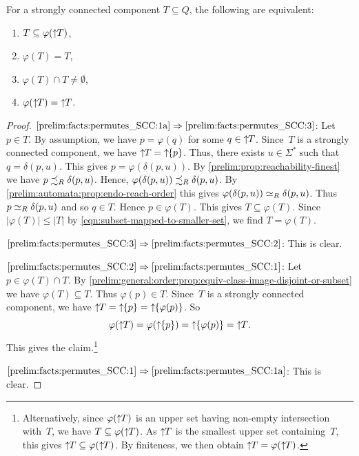 \begin{corollary} \label{prelim:automata:prop:endo:SCC}
	For a strongly connected component $T \subseteq Q$,
	the following are equivalent:
	\begin{enumerate}
		\item \label{prelim:facts:permutes_SCC:1a} $T \subseteq \varphi(\mbox{\ensuremath{\displaystyle \uparrow \!\!T}})$,
		
		\item \label{prelim:facts:permutes_SCC:3} $\varphi(T) = T$,

		\item \label{prelim:facts:permutes_SCC:2} $\varphi(T) \cap T \ne \emptyset$,
		
		\item \label{prelim:facts:permutes_SCC:1} $\varphi(\mbox{\ensuremath{\displaystyle \uparrow \!\!T}}) = \mbox{\ensuremath{\displaystyle \uparrow \!\!T}}$.
	\end{enumerate}	
\end{corollary}
\begin{proof}

$\ref{prelim:facts:permutes_SCC:1a} \Rightarrow \ref{prelim:facts:permutes_SCC:3}$:
Let $p \in T$. By assumption, we have $p = \varphi(q)$ for some $q \in \mbox{\ensuremath{\displaystyle \uparrow \!\!T}}$.
Since~$T$ is a strongly connected component,
we have $\mbox{\ensuremath{\displaystyle \uparrow \!\!T}} = \mbox{\ensuremath{\displaystyle \uparrow \!\!\{p\}}}$.
Thus, there exists $u \in \Sigma^*$ such that $q = \delta(p, u)$.
This gives $p = \varphi(\delta(p, u))$.
By \cref{prelim:prop:reachability-finest} we have 
$p \precsim_R \delta(p, u)$.
Hence, $\varphi(\delta(p, u)) \precsim_R \delta(p, u)$.
By \cref{prelim:automata:prop:endo-reach-order}
this gives $\varphi(\delta(p, u)) \simeq_R \delta(p, u)$.
Thus $p \simeq_R \delta(p, u)$
and so $q \in T$. Hence $p \in \varphi(T)$.
This gives $T \subseteq \varphi(T)$.
Since $|\varphi(T)| \le |T|$ by \cref{eqn:subset-mapped-to-smaller-set},
we find $T = \varphi(T)$.	

$\ref{prelim:facts:permutes_SCC:3} \Rightarrow \ref{prelim:facts:permutes_SCC:2}$: This is clear.

$\ref{prelim:facts:permutes_SCC:2} \Rightarrow \ref{prelim:facts:permutes_SCC:1}$: Let $p \in \varphi(T) \cap T$.
By \cref{prelim:general:order:prop:equiv-class-image-disjoint-or-subset} 
we have $\varphi(T) \subseteq T$.
Thus $\varphi(p) \in T$.
Since~$T$ is a strongly connected
component, we have $\mbox{\ensuremath{\displaystyle \uparrow \!\!T}} = \mbox{\ensuremath{\displaystyle \uparrow \!\!\{p\}}} = \mbox{\ensuremath{\displaystyle \uparrow \!\!\{\varphi(p)\}}}$. So
\[
\varphi(\upperset{T})
= \varphi(\upperset{\{p\}})
= \upperset{\{\varphi(p)\}}
= \upperset{T}.
\]
This gives the claim.\footnote{Alternatively,
	since $\varphi(\mbox{\ensuremath{\displaystyle \uparrow \!\!T}})$ is an upper set having non-empty intersection with~$T$,
	we have $T \subseteq \varphi(\mbox{\ensuremath{\displaystyle \uparrow \!\!T}})$.
	As $\mbox{\ensuremath{\displaystyle \uparrow \!\!T}}$ is the smallest upper set containing~$T$,
	this gives $\mbox{\ensuremath{\displaystyle \uparrow \!\!T}}\subseteq \varphi(\mbox{\ensuremath{\displaystyle \uparrow \!\!T}})$.
	By finiteness, we then obtain 
	$\mbox{\ensuremath{\displaystyle \uparrow \!\!T}} = \varphi(\mbox{\ensuremath{\displaystyle \uparrow \!\!T}})$.}
	
$\ref{prelim:facts:permutes_SCC:1} \Rightarrow \ref{prelim:facts:permutes_SCC:1a}$:	This is clear.
\end{proof}

